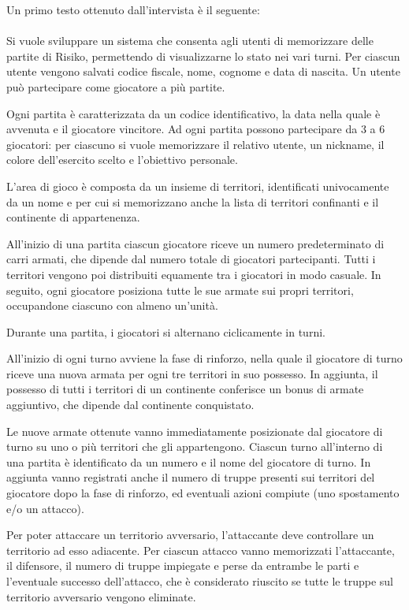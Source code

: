 \documentclass[a4paper,12pt]{report}
\begin{document}
Un primo testo ottenuto dall’intervista è il seguente: \\ \\
Si vuole sviluppare un sistema che consenta agli utenti di memorizzare delle partite di Risiko, permettendo di visualizzarne lo stato nei vari turni. Per ciascun utente vengono salvati codice fiscale, nome, cognome e data di nascita. Un utente può partecipare come giocatore a più partite. \par
Ogni partita è caratterizzata da un codice identificativo, la data nella quale è avvenuta e il giocatore vincitore.
Ad ogni partita possono partecipare da 3 a 6 giocatori: per ciascuno si vuole memorizzare il relativo utente, un nickname, il colore dell’esercito scelto e l’obiettivo personale. \par
L’area di gioco è composta da un insieme di territori, identificati univocamente da un nome e per cui si memorizzano anche la lista di territori confinanti e il continente di appartenenza. \par
All’inizio di una partita ciascun giocatore riceve un numero predeterminato di carri armati, che dipende dal numero totale di giocatori partecipanti. Tutti i territori vengono poi distribuiti equamente tra i giocatori in modo casuale. In seguito, ogni giocatore posiziona tutte le sue armate sui propri territori, occupandone ciascuno con almeno un’unità. \par
Durante una partita, i giocatori si alternano ciclicamente in turni. \par
All’inizio di ogni turno avviene la fase di rinforzo, nella quale il giocatore di turno riceve una nuova armata per ogni tre territori in suo possesso. In aggiunta, il possesso di tutti i territori di un continente conferisce un bonus di armate aggiuntivo, che dipende dal continente conquistato. \par 
Le nuove armate ottenute vanno immediatamente posizionate dal giocatore di turno su uno o più territori che gli appartengono.
Ciascun turno all’interno di una partita è identificato da un numero e il nome del giocatore di turno. In aggiunta vanno registrati anche il numero di truppe presenti sui territori del giocatore dopo la fase di rinforzo, ed eventuali azioni compiute (uno spostamento e/o un attacco). \par
Per poter attaccare un territorio avversario, l’attaccante deve controllare un territorio ad esso adiacente. Per ciascun attacco vanno memorizzati l’attaccante, il difensore, il numero di truppe impiegate e perse da entrambe le parti e l’eventuale successo dell’attacco, che è considerato riuscito se tutte le truppe sul territorio avversario vengono eliminate. \par
\end{document}
